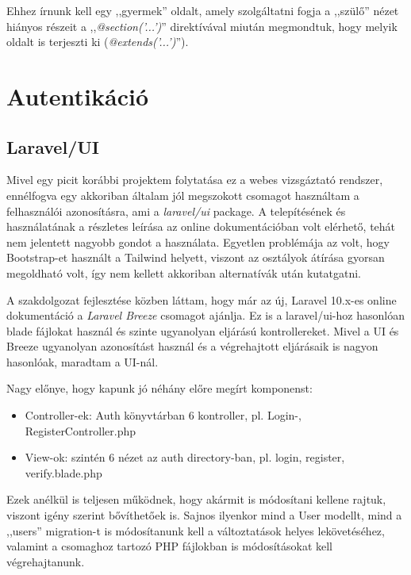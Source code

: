 \documentclass[
]{thesis-ekf}
\theoremstyle{definition}
\theoremstyle{remark}
\begin{document}
                    Ehhez írnunk kell egy ,,gyermek'' oldalt, amely szolgáltatni fogja a ,,szülő'' nézet hiányos részeit a ,,\emph{@section('...')}'' direktívával miután megmondtuk, hogy melyik oldalt is terjeszti ki (\emph{@extends('...')}'').
                    
                    
            \section{Autentikáció}
                \subsection{Laravel/UI}
                Mivel egy picit korábbi projektem folytatása ez a webes vizsgáztató rendszer, ennélfogva egy akkoriban általam jól megszokott csomagot használtam a felhasználói azonosításra, ami a \emph{laravel/ui} package. A telepítésének és használatának a részletes leírása az online dokumentációban\cite{Laravel-7Auth} volt elérhető, tehát nem jelentett nagyobb gondot a használata. Egyetlen problémája az volt, hogy Bootstrap-et használt a Tailwind helyett, viszont az osztályok átírása gyorsan megoldható volt, így nem kellett akkoriban alternatívák után kutatgatni. 

                A szakdolgozat fejlesztése közben láttam, hogy már az új, Laravel 10.x-es online dokumentáció\cite{Laravel-10Auth} a \emph{Laravel Breeze} csomagot ajánlja. Ez is a laravel/ui-hoz hasonlóan blade fájlokat használ és szinte ugyanolyan eljárású kontrollereket. Mivel a UI és Breeze ugyanolyan azonosítást használ és a végrehajtott eljárásaik is nagyon hasonlóak, maradtam a UI-nál.

                Nagy előnye, hogy kapunk jó néhány előre megírt komponenst:
                \begin{itemize}
                    \item Controller-ek: Auth könyvtárban 6 kontroller, pl. Login-, RegisterController.php
                    \item View-ok: szintén 6 nézet az auth directory-ban, pl. login, register, verify.blade.php
                \end{itemize}
                Ezek anélkül is teljesen működnek, hogy akármit is módosítani kellene rajtuk, viszont igény szerint bővíthetőek is. Sajnos ilyenkor mind a User modellt, mind a ,,users'' migration-t is módosítanunk kell a változtatások helyes lekövetéséhez, valamint a csomaghoz tartozó PHP fájlokban is módosításokat kell végrehajtanunk.
\end{document}
